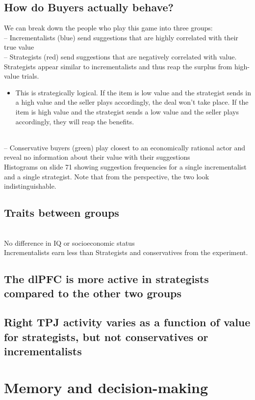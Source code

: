 \subsection{How do Buyers actually behave?}
We can break down the people who play this game into three groups:
\\– Incrementalists (blue) send suggestions that are highly correlated with their true value
\\– Strategists (red) send suggestions that are negatively correlated with value. Strategists appear similar to
incrementalists and thus reap the surplus from high-value trials.
\begin{itemize}
    \item This is strategically logical. If the item is low value and the strategist sends in a high value and the seller plays accordingly, the deal won't take place. If the item is high value and the strategist sends a low value and the seller plays accordingly, they will reap the benefits.
\end{itemize}
\\– Conservative buyers (green) play closest to an economically rational actor and reveal no information about their
value with their suggestions
\\Histograms on slide 71 showing suggestion frequencies for a single incrementalist and a single strategist. Note that from the perspective, the two look indistinguishable.
\subsection{Traits between groups}
\\No difference in IQ or socioeconomic status
\\Incrementalists earn less than Strategists and conservatives from the experiment.
\subsection{The dlPFC is more active in strategists compared to the other two groups}
\subsection{Right TPJ activity varies as a function of value for strategists, but not conservatives or incrementalists}

\section{Memory and decision-making}
